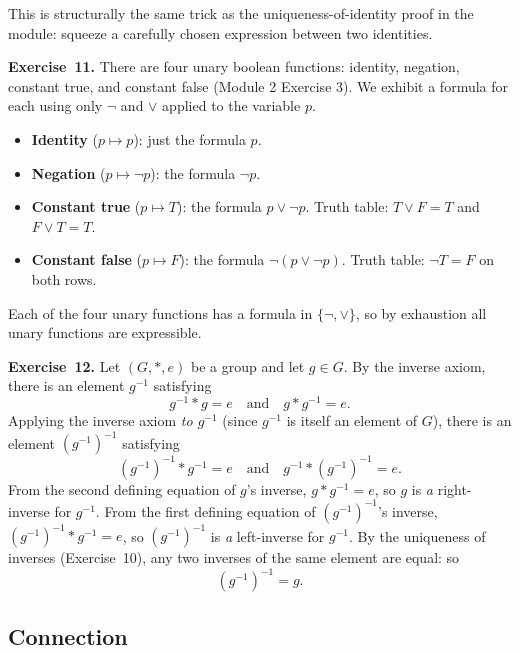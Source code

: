 \documentclass[11pt]{article}
\begin{document}
This is structurally the same trick as the uniqueness-of-identity proof in the module: squeeze a carefully chosen expression between two identities.

\medskip
\textbf{Exercise~11.}
There are four unary boolean functions: identity, negation, constant true, and constant false (Module 2 Exercise 3). We exhibit a formula for each using only $\lnot$ and $\vee$ applied to the variable $p$.
\begin{itemize}
  \item \textbf{Identity} ($p \mapsto p$): just the formula $p$.
  \item \textbf{Negation} ($p \mapsto \lnot p$): the formula $\lnot p$.
  \item \textbf{Constant true} ($p \mapsto T$): the formula $p \vee \lnot p$. Truth table: $T \vee F = T$ and $F \vee T = T$. \checkmark
  \item \textbf{Constant false} ($p \mapsto F$): the formula $\lnot(p \vee \lnot p)$. Truth table: $\lnot T = F$ on both rows. \checkmark
\end{itemize}
Each of the four unary functions has a formula in $\{\lnot, \vee\}$, so by exhaustion all unary functions are expressible.

\medskip
\textbf{Exercise~12.}
Let $(G, *, e)$ be a group and let $g \in G$. By the inverse axiom, there is an element $g^{-1}$ satisfying
\[
  g^{-1} * g = e \quad \text{and} \quad g * g^{-1} = e.
\]
Applying the inverse axiom \emph{to $g^{-1}$} (since $g^{-1}$ is itself an element of $G$), there is an element $(g^{-1})^{-1}$ satisfying
\[
  (g^{-1})^{-1} * g^{-1} = e \quad \text{and} \quad g^{-1} * (g^{-1})^{-1} = e.
\]
From the second defining equation of $g$'s inverse, $g * g^{-1} = e$, so $g$ is \emph{a} right-inverse for $g^{-1}$. From the first defining equation of $(g^{-1})^{-1}$'s inverse, $(g^{-1})^{-1} * g^{-1} = e$, so $(g^{-1})^{-1}$ is \emph{a} left-inverse for $g^{-1}$. By the uniqueness of inverses (Exercise~10), any two inverses of the same element are equal: so
\[
  (g^{-1})^{-1} = g. \tag*{$\square$}
\]

\subsection*{Connection}
\end{document}
